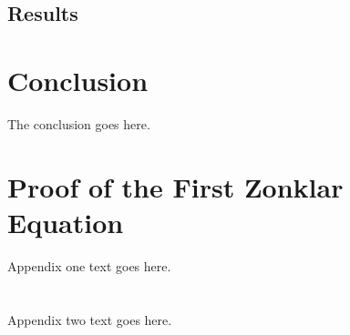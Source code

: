 \documentclass[journal]{IEEEtran}
\begin{document}
\subsection{Results}


 















\section{Conclusion}
The conclusion goes here.






%


\appendices
\section{Proof of the First Zonklar Equation}
Appendix one text goes here.

\section{}
Appendix two text goes here.
\end{document}
